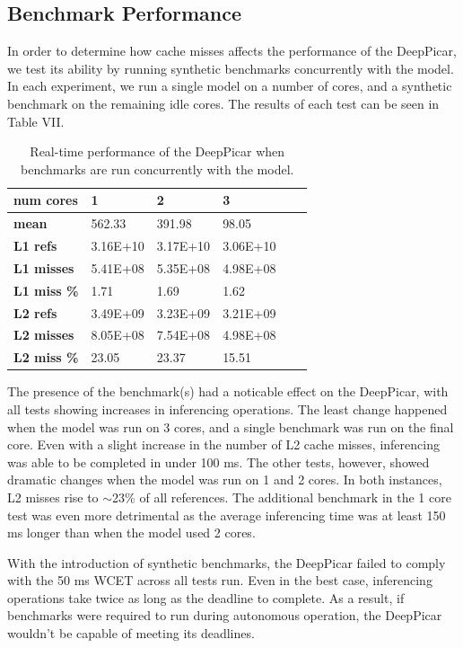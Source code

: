 \subsection{Benchmark Performance}
In order to determine how cache misses affects the performance of the DeepPicar, we test its ability by 
running synthetic benchmarks concurrently with the model. In each experiment, we run a single model on a 
number of cores, and a synthetic benchmark on the remaining idle cores. The results of each test can be 
seen in Table VII.

\begin{table}[h]
\centering
  \begin{tabular} {| l | l | l | l | l | l |}
  \hline
  \textbf{num cores} & 1 & 2 & 3 \\ \hline
  \textbf{mean} & 562.33 & 391.98 & 98.05 \\ \hline
  \textbf{L1 refs} & 3.16E+10 & 3.17E+10 & 3.06E+10 \\ \hline
  \textbf{L1 misses} & 5.41E+08 & 5.35E+08 & 4.98E+08 \\ \hline
  \textbf{L1 miss \%} & 1.71 & 1.69 & 1.62 \\ \hline
  \textbf{L2 refs} & 3.49E+09 & 3.23E+09 & 3.21E+09 \\ \hline
  \textbf{L2 misses} & 8.05E+08 & 7.54E+08 & 4.98E+08 \\ \hline
  \textbf{L2 miss \%} & 23.05 & 23.37 & 15.51 \\ 
  \hline
  \end{tabular}
  \caption{Real-time performance of the DeepPicar when benchmarks are run concurrently with the model.}
\end{table}

The presence of the benchmark(s) had a noticable effect on the DeepPicar, with all tests showing 
increases in inferencing operations. The least change happened when the model was run on 3 cores, and a 
single benchmark was run on the final core. Even with a slight increase in the number of L2 cache 
misses, inferencing was able to be completed in under 100 ms. The other tests, however, showed dramatic 
changes when the model was run on 1 and 2 cores. In both instances, L2 misses rise to $\sim$23\% of all 
references. The additional benchmark in the 1 core test was even more detrimental as the average 
inferencing time was at least 150 ms longer than when the model used 2 cores. 

With the introduction of synthetic benchmarks, the DeepPicar failed to comply with the 50 ms WCET across 
all tests run. Even in the best case, inferencing operations take twice as long as the deadline to 
complete. As a result, if benchmarks were required to run during autonomous operation, the DeepPicar 
wouldn't be capable of meeting its deadlines.

